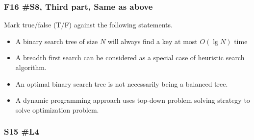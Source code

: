 \subsubsection{F16 \#S8, Third part, Same as above}
	Mark true/false (T/F) against the following statements.  
	
	\begin{itemize}
		\item A binary search tree of size $N$ will always find a key at most $O(\lg N)$ time
		\item A breadth first search can be considered as a special case of heuristic search algorithm.
		\item An optimal binary search tree is not necessarily being a balanced tree.
		\item A dynamic programming approach uses top-down problem solving strategy to solve optimization problem.
	\end{itemize}



\subsubsection{S15 \#L4}

